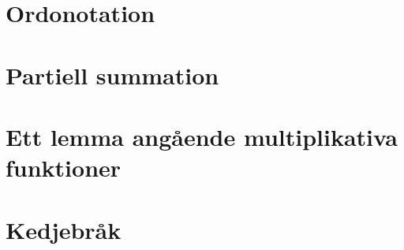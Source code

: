 \documentclass[a4paper]{article}
\begin{document}
%


\newpage
\printbibliography

\medskip

\newpage
\appendix
\section{Ordonotation}

\section{Partiell summation}
\section{Ett lemma angående multiplikativa funktioner}

\section{Kedjebråk}
\end{document}
